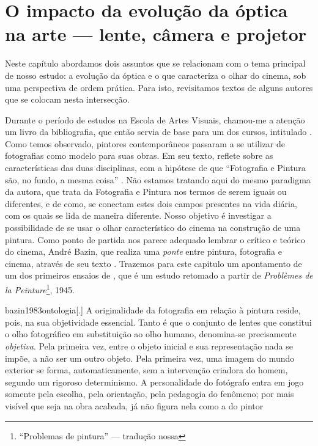 \chapter{O impacto da evolução da óptica na arte --- lente, câmera e projetor}%
\label{cap2-impacto-evolucao-otica}

Neste capítulo abordamos dois assuntos que se relacionam com o tema
principal de nosso estudo: a evolução da óptica e o que caracteriza o
olhar do cinema, sob uma perspectiva de ordem prática. Para isto,
revisitamos textos de alguns autores que se colocam nesta intersecção.

Durante o período de estudos na Escola de Artes Visuais, chamou-me a
atenção um livro da bibliografia, que então servia de base para um dos
cursos, intitulado . Como
temos observado, pintores contemporâneos passaram a se utilizar de
fotografias como modelo para suas obras. Em seu texto, \textcite{flores2011fotografia}
reflete sobre as características das duas disciplinas, com a hipótese de que
\enquote{Fotografia e Pintura são, no fundo, a mesma coisa}
\parencite[7]{flores2011fotografia}. Não estamos tratando aqui do mesmo
paradigma da autora, que trata da Fotografia e Pintura nos termos de
serem iguais ou diferentes, e de como, se conectam estes dois campos
presentes na vida diária, com os quais se lida de maneira diferente.
Nosso objetivo é investigar a possibilidade de se usar o olhar
característico do cinema na construção de uma pintura. Como ponto de
partida nos parece adequado lembrar o crítico e teórico do cinema,
André Bazin, que realiza uma \emph{ponte} entre pintura, fotografia e
cinema, através de seu texto .
Trazemos para este capitulo um apontamento de um dos primeiros ensaios
de \textcite{bazin1983ontologia}, que é um estudo retomado a partir de
\emph{Problèmes de la Peinture}\footnote{\enquote{Problemas de pintura}
	--- tradução nossa}, 1945.

\begin{displaycquote}[125]{bazin1983ontologia}[.]
	A originalidade da fotografia em relação à pintura reside, pois, na sua
	objetividade essencial. Tanto é que o conjunto de lentes que constitui o
	olho fotográfico em substituição ao olho humano, denomina-se
	precisamente \emph{objetiva}. Pela primeira vez, entre o objeto inicial
	e sua representação nada se impõe, a não ser um outro objeto. Pela
	primeira vez, uma imagem do mundo exterior se forma, automaticamente,
	sem a intervenção criadora do homem, segundo um rigoroso determinismo. A
	personalidade do fotógrafo entra em jogo somente pela escolha, pela
	orientação, pela pedagogia do fenômeno; por mais visível que seja na
	obra acabada, já não figura nela como a do pintor
\end{displaycquote}

